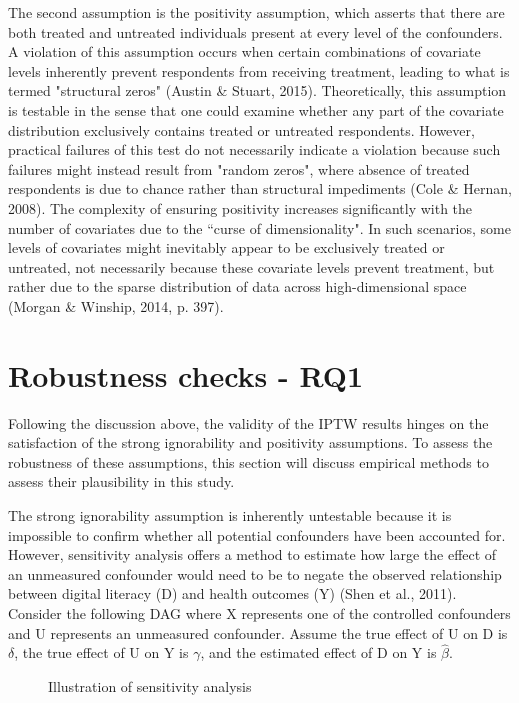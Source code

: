 The second assumption is the positivity assumption, which asserts that there are both treated and untreated individuals present at every level of the confounders. A violation of this assumption occurs when certain combinations of covariate levels inherently prevent respondents from receiving treatment, leading to what is termed "structural zeros" (Austin \& Stuart, 2015). Theoretically, this assumption is testable in the sense that one could examine whether any part of the covariate distribution exclusively contains treated or untreated respondents. However, practical failures of this test do not necessarily indicate a violation because such failures might instead result from "random zeros", where absence of treated respondents is due to chance rather than structural impediments (Cole \& Hernan, 2008). The complexity of ensuring positivity increases significantly with the number of covariates due to the ``curse of dimensionality". In such scenarios, some levels of covariates might inevitably appear to be exclusively treated or untreated, not necessarily because these covariate levels prevent treatment, but rather due to the sparse distribution of data across high-dimensional space (Morgan \& Winship, 2014, p. 397).

\section{Robustness checks - RQ1}
Following the discussion above, the validity of the IPTW results hinges on the satisfaction of the strong ignorability and positivity assumptions. To assess the robustness of these assumptions, this section will discuss empirical methods to assess their plausibility in this study.

The strong ignorability assumption is inherently untestable because it is impossible to confirm whether all potential confounders have been accounted for. However, sensitivity analysis offers a method to estimate how large the effect of an unmeasured confounder would need to be to negate the observed relationship between digital literacy (D) and health outcomes (Y) (Shen et al., 2011). Consider the following DAG where X represents one of the controlled confounders and U represents an unmeasured confounder. Assume the true effect of U on D is $\delta$, the true effect of U on Y is $\gamma$, and the estimated effect of D on Y is $\hat{\beta}$.

\begin{figure}[h!]
    \centering
    \caption{Illustration of sensitivity analysis}
    \label{fig:sense_dag}
\end{figure}

